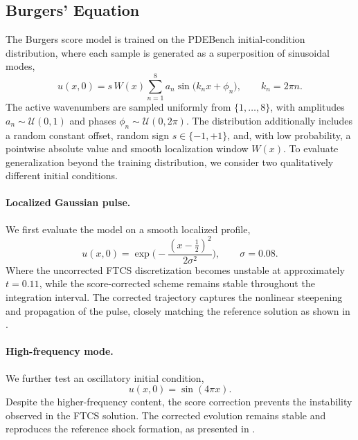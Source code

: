 \documentclass[letterpaper]{article} %
\begin{document}
\subsection{Burgers' Equation}
\label{app:gen_burgers}

The Burgers score model is trained on the PDEBench initial-condition
distribution, where each sample is generated as a superposition of sinusoidal
modes,
\begin{equation}
    u(x,0) = s\, W(x) \sum_{n=1}^{8} a_n \sin\!\big(k_n x + \phi_n\big),
    \qquad k_n = 2\pi n .
\end{equation}
The active wavenumbers are sampled uniformly from $\{1,\dots,8\}$, with
amplitudes $a_n\sim\mathcal{U}(0,1)$ and phases
$\phi_n\sim\mathcal{U}(0,2\pi)$. The distribution additionally includes a
random constant offset, random sign $s\in\{-1,+1\}$, and, with low probability,
a pointwise absolute value and smooth localization window $W(x)$. To evaluate
generalization beyond the training distribution, we consider two qualitatively
different initial conditions.

\paragraph{Localized Gaussian pulse.}
We first evaluate the model on a smooth localized profile,
\begin{equation}
    u(x,0) = \exp\!\Big(-\frac{(x-\tfrac12)^2}{2\sigma^2}\Big),
    \qquad \sigma = 0.08 .
\end{equation}
Where the uncorrected FTCS discretization becomes
unstable at approximately $t=0.11$, while the score-corrected scheme remains
stable throughout the integration interval. The corrected trajectory captures
the nonlinear steepening and propagation of the pulse, closely matching the
reference solution as shown in .

\paragraph{High-frequency mode.}
We further test an oscillatory initial condition,
\begin{equation}
    u(x,0)=\sin(4\pi x).
\end{equation}
Despite the higher-frequency content, the score correction prevents the instability observed
in the FTCS solution. The corrected evolution remains stable and
reproduces the reference shock formation, as presented in .
\end{document}
